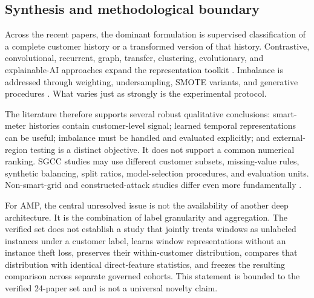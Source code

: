 \subsection{Synthesis and methodological boundary}

Across the recent papers, the dominant formulation is supervised classification of a complete customer history or a transformed version of that history. Contrastive, convolutional, recurrent, graph, transfer, clustering, evolutionary, and explainable-AI approaches expand the representation toolkit \cite{Liu2023ContrastiveETD,Khan2023AlexNet,Huang2024DualTime,Zhuang2024GraphETD,Tursunboev2024MultiObjective,Wang2024NewRegions,Iqbal2025TransferTemporal,Liupeng2026ExplainableETD,Yang2024AntColony}. Imbalance is addressed through weighting, undersampling, SMOTE variants, and generative procedures \cite{Pamir2023EnergyOptimization,Iftikhar2024MLPGRU,Gunduz2024HybridCNN}. What varies just as strongly is the experimental protocol.

The literature therefore supports several robust qualitative conclusions: smart-meter histories contain customer-level signal; learned temporal representations can be useful; imbalance must be handled and evaluated explicitly; and external-region testing is a distinct objective. It does not support a common numerical ranking. SGCC studies may use different customer subsets, missing-value rules, synthetic balancing, split ratios, model-selection procedures, and evaluation units. Non-smart-grid and constructed-attack studies differ even more fundamentally \cite{Saqib2024NonSmartGrid,Gunduz2024HybridCNN}.

For AMP, the central unresolved issue is not the availability of another deep architecture. It is the combination of label granularity and aggregation. The verified set does not establish a study that jointly treats windows as unlabeled instances under a customer label, learns window representations without an instance theft loss, preserves their within-customer distribution, compares that distribution with identical direct-feature statistics, and freezes the resulting comparison across separate governed cohorts. This statement is bounded to the verified 24-paper set and is not a universal novelty claim.
